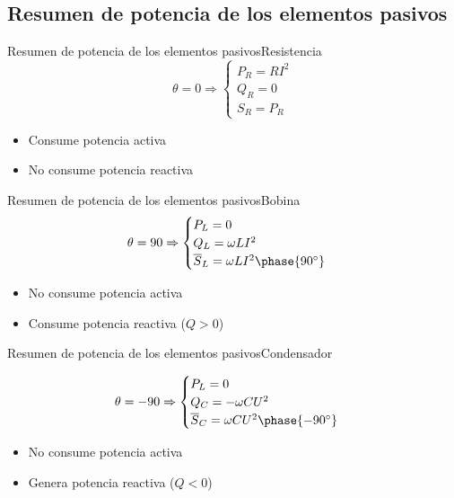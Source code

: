 \documentclass[aspectratio=169, xcolor={usenames,svgnames,dvipsnames}]{beamer}
\begin{document}
\subsection{Resumen de potencia de los elementos pasivos}

\begin{frame}{Resumen de potencia de los elementos pasivos}{Resistencia}
\[
\theta = 0 \Rightarrow 
\begin{cases}
  P_R = R I^2\\
  Q_R = 0\\
  S_R = P_R
\end{cases}
\]

\begin{itemize}
\item Consume potencia activa
\item No consume potencia reactiva
\end{itemize}
\end{frame}

\begin{frame}{Resumen de potencia de los elementos pasivos}{Bobina}
\[
\theta = 90 \Rightarrow 
\begin{cases}
  P_L = 0\\
  Q_L = \omega L I^2\\
  \overline{S}_L = \omega L I^2 \phase{90^\circ}
\end{cases}
\]

\begin{itemize}
\item No consume potencia activa
\item Consume potencia reactiva (\(Q > 0\))
\end{itemize}
\end{frame}

\begin{frame}{Resumen de potencia de los elementos pasivos}{Condensador}

\[
\theta = - 90 \Rightarrow 
\begin{cases}
  P_L = 0\\
  Q_C = - \omega C U^2\\
  \overline{S}_C = \omega C U^2 \phase{-90^\circ}
\end{cases}
\]

\begin{itemize}
\item No consume potencia activa
\item Genera potencia reactiva (\(Q < 0\))
\end{itemize}
\end{frame}
\end{document}
